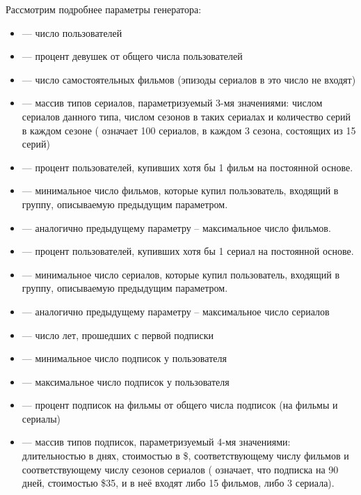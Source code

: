 

Рассмотрим подробнее параметры генератора:

\begin{itemize}
	\item {} --- число пользователей
	\item {} --- процент девушек от общего числа пользователей
	\item {} --- число самостоятельных фильмов (эпизоды сериалов в это число не входят)
	\item {} --- массив типов сериалов, параметризуемый 3-мя значениями: числом сериалов данного типа, числом сезонов в таких сериалах и количество серий в каждом сезоне (\code{[100, 3, 15]} означает 100 сериалов, в каждом 3 сезона, состоящих из 15 серий)
	\item {} --- процент пользователей, купивших хотя бы 1 фильм на постоянной основе.
	\item {} --- минимальное число фильмов, которые купил пользователь, входящий в группу, описываемую предыдущим параметром.
	\item {} --- аналогично предыдущему параметру -- максимальное число фильмов.
	\item {} --- процент пользователей, купивших хотя бы 1 сериал на постоянной основе.
	\item {} --- минимальное число сериалов, которые купил пользователь, входящий в группу, описываемую предыдущим параметром.
	\item {} --- аналогично предыдущему параметру -- максимальное число сериалов
	\item {} --- число лет, прошедших с первой подписки
	\item {} --- минимальное число подписок у пользователя
	\item {} --- максимальное число подписок у пользователя
	\item {} --- процент подписок на фильмы от общего числа подписок (на фильмы и сериалы)
	\item {} --- массив типов подписок, параметризуемый 4-мя значениями: длительностью в днях, стоимостью в \$, соответствующему числу фильмов и соответствующему числу сезонов сериалов (\code{[90, 35, 15, 3]} означает, что подписка на 90 дней, стоимостью \$35, и в неё входят либо 15 фильмов, либо 3 сериала).



\end{itemize}
